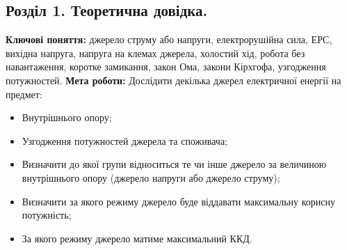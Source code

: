 \documentclass[a4paper,12pt]{article}
\begin{document}
\begin{justify}
	\section{Розділ 1. Теоретична довідка.}
	\textbf{Ключові поняття:}  джерело струму або напруги, електрорушійна сила, ЕРС, вихідна напруга, напруга на клемах джерела, холостий хід, робота без навантаження, коротке замикання, закон Ома, закони Кірхгофа, узгодження потужностей.\bigbreak
	\textbf{Мета роботи:} Дослідити декілька джерел електричної енергії на предмет: 
	\begin{itemize}
		\item Внутрішнього опору;
		\item Узгодження потужностей джерела та споживача;
		\item Визначити до якої групи відноситься те чи інше джерело за величиною внутрішнього опору (джерело напруги або джерело струму);
		\item Визначити за якого режиму джерело буде віддавати максимальну корисну потужність;
		\item За якого режиму джерело матиме максимальний ККД.
	\end{itemize}

\end{justify}
\end{document}
